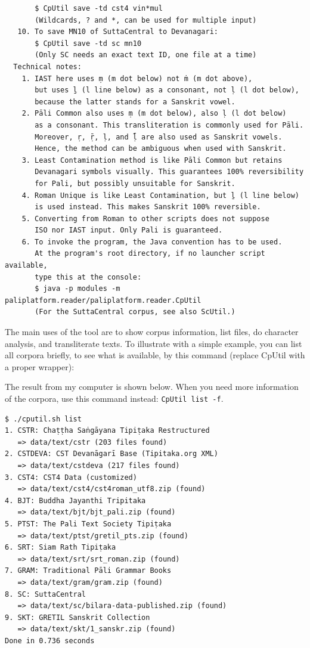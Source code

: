 {\begin{verbatim}
       $ CpUtil save -td cst4 vin*mul
       (Wildcards, ? and *, can be used for multiple input)
   10. To save MN10 of SuttaCentral to Devanagari:
       $ CpUtil save -td sc mn10
       (Only SC needs an exact text ID, one file at a time)
  Technical notes:
    1. IAST here uses ṃ (m dot below) not ṁ (m dot above),
       but uses ḻ (l line below) as a consonant, not ḷ (l dot below),
       because the latter stands for a Sanskrit vowel.
    2. Pāli Common also uses ṃ (m dot below), also ḷ (l dot below)
       as a consonant. This transliteration is commonly used for Pāli.
       Moreover, ṛ, ṝ, ḷ, and ḹ are also used as Sanskrit vowels.
       Hence, the method can be ambiguous when used with Sanskrit.
    3. Least Contamination method is like Pāli Common but retains
       Devanagari symbols visually. This guarantees 100% reversibility
       for Pali, but possibly unsuitable for Sanskrit.
    4. Roman Unique is like Least Contamination, but ḻ (l line below)
       is used instead. This makes Sanskrit 100% reversible.
    5. Converting from Roman to other scripts does not suppose
       ISO nor IAST input. Only Pali is guaranteed.
    6. To invoke the program, the Java convention has to be used.
       At the program's root directory, if no launcher script available,
       type this at the console: 
       $ java -p modules -m paliplatform.reader/paliplatform.reader.CpUtil
       (For the SuttaCentral corpus, see also ScUtil.)
\end{verbatim}
}

The main uses of the tool are to show corpus information, list files, do character analysis, and transliterate texts. To illustrate with a simple example, you can list all corpora briefly, to see what is available, by this command (replace CpUtil with a proper wrapper):


The result from my computer is shown below. When you need more information of the corpora, use this command instead: \texttt{CpUtil list -f}.

{\footnotesize
\begin{verbatim}
$ ./cputil.sh list
1. CSTR: Chaṭṭha Saṅgāyana Tipiṭaka Restructured
   => data/text/cstr (203 files found)
2. CSTDEVA: CST Devanāgarī Base (Tipitaka.org XML)
   => data/text/cstdeva (217 files found)
3. CST4: CST4 Data (customized)
   => data/text/cst4/cst4roman_utf8.zip (found)
4. BJT: Buddha Jayanthi Tripitaka
   => data/text/bjt/bjt_pali.zip (found)
5. PTST: The Pali Text Society Tipiṭaka
   => data/text/ptst/gretil_pts.zip (found)
6. SRT: Siam Rath Tipiṭaka
   => data/text/srt/srt_roman.zip (found)
7. GRAM: Traditional Pāli Grammar Books
   => data/text/gram/gram.zip (found)
8. SC: SuttaCentral
   => data/text/sc/bilara-data-published.zip (found)
9. SKT: GRETIL Sanskrit Collection
   => data/text/skt/1_sanskr.zip (found)
Done in 0.736 seconds
\end{verbatim}
}

